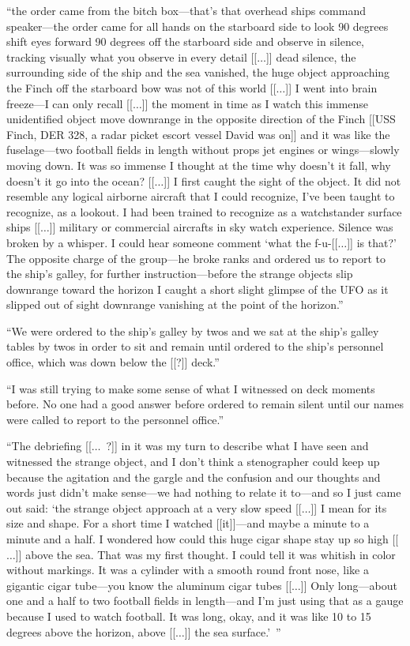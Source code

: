 \begin{svgraybox}
``the order came from the bitch  box---that's that overhead ships command speaker---the order came for all hands on the starboard side to
look 90 degrees shift eyes forward 90 degrees off the starboard side and observe in silence, tracking visually what you observe in every detail
[[$\ldots$]]
dead silence, the surrounding side of the ship and the sea vanished, the huge object approaching the Finch off the starboard bow was not of this
world [[$\ldots$]] I went into brain freeze---I can only recall [[$\ldots$]] the moment in time
as I watch this immense unidentified object move downrange in the opposite direction of the Finch
[[USS Finch, DER 328, a radar picket escort vessel David was on]]
and it was like the fuselage---two football fields in length without props jet engines or wings---slowly moving down.
It was so immense I thought at the time why doesn't it fall, why doesn't it go
into the ocean?
[[$\ldots$]]
I first caught the sight of the object. It did not resemble any logical airborne aircraft
that I could recognize, I've been taught to recognize, as a lookout.
I had been trained to recognize as a watchstander surface ships
[[$\ldots$]] military or commercial aircrafts in sky watch experience.
Silence was broken by a whisper.
I could hear someone comment `what the  f-u-[[$\ldots$]] is that?'
The opposite charge of the group---he broke ranks and ordered us to report to the ship's galley,
for further instruction---before the strange objects slip downrange toward the horizon
I caught a short slight glimpse of the UFO as it slipped out of sight
downrange vanishing at the point of the horizon.''


``We were ordered to
the ship's galley by twos and we sat at the ship's galley tables by twos in order to sit and remain until ordered to the
ship's personnel office, which was down below the [[?]] deck.''

``I was still trying to make some sense of what I witnessed on deck moments before. No one had a good answer before ordered
to remain silent until our names were called to report to the personnel office.''

``The debriefing [[$\ldots$~?]] in it was my turn to describe what I have seen and witnessed the strange object,
 and I don't think a stenographer could keep up because the agitation and the gargle
and the confusion and our thoughts and words just didn't make sense---we had nothing to relate it to---and
so I just came out said:
`the strange object approach at a very slow speed [[$\ldots$]] I mean for its size and shape.
For a short time I watched [[it]]---and maybe
a minute to a minute and a half.
I wondered how could this huge cigar shape stay up so high [[$\ldots$]] above the sea.
That was my first thought. I could tell it was whitish in color without markings.
It was a cylinder with a smooth round front nose,
like a gigantic cigar tube---you know the aluminum cigar tubes [[$\ldots$]]
Only long---about one and a half to two football fields in length---and I'm just using that as a gauge because I used to watch football.
It was long, okay, and it was like 10 to 15 degrees above the horizon, above [[$\ldots$]]  the sea surface.'~''
\end{svgraybox}



